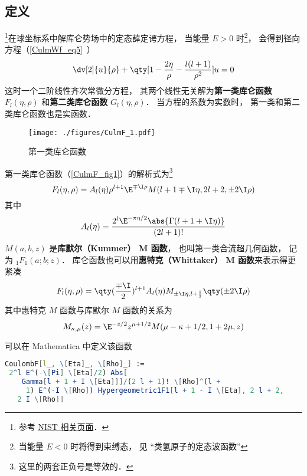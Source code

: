 

\subsection{定义}
\footnote{参考 \href{https://dlmf.nist.gov/33.2}{NIST 相关页面}．}在球坐标系中解库仑势场中的定态薛定谔方程， 当能量 $E > 0$ 时\footnote{当能量 $E < 0$ 时将得到束缚态， 见 “类氢原子的定态波函数”}， 会得到径向方程（\autoref{CulmWf_eq5}~）
\begin{equation}
\dv[2]{u}{\rho} + \qty[1 - \frac{2\eta}{\rho} - \frac{l(l+1)}{\rho^2}]u = 0
\end{equation}
这时一个二阶线性齐次常微分方程， 其两个线性无关解为\textbf{第一类库仑函数} $F_l(\eta, \rho)$ 和\textbf{第二类库仑函数} $G_l(\eta, \rho)$． 当方程的系数为实数时， 第一类和第二类库仑函数也是实函数．

\begin{figure}[ht]
\centering
\texttt{[image: ./figures/CulmF\_1.pdf]}
\caption{第一类库仑函数} \label{CulmF_fig1}
\end{figure}

第一类库仑函数（\autoref{CulmF_fig1}）的解析式为\footnote{这里的两套正负号是等效的．}
\begin{equation}
F_l(\eta, \rho) = A_l(\eta) \rho^{l+1} \E^{\mp\I\rho} M(l+1\mp\I\eta, 2l+2, \pm 2\I\rho)
\end{equation}
其中
\begin{equation}
A_l(\eta) = \frac{2^l \E^{-\pi\eta/2} \abs{\Gamma(l+1+\I\eta)}}{(2l+1)!}
\end{equation}
$M(a, b, z)$ 是\textbf{库默尔（Kummer） M 函数}， 也叫第一类合流超几何函数， 记为 $_1 F_1(a;b;z)$． 库仑函数也可以用\textbf{惠特克（Whittaker） M 函数}来表示得更紧凑
\begin{equation}
F_l(\eta, \rho) = \qty(\frac{\mp\I}{2})^{l+1} A_l(\eta) M_{\pm\I\eta, l+\frac12}\qty(\pm 2\I\rho)
\end{equation}
其中惠特克 $M$ 函数与库默尔 $M$ 函数的关系为
\begin{equation}
M_{\kappa, \mu}(z) = \E^{-z/2} z^{\mu + 1/2} M(\mu - \kappa + 1/2, 1 + 2\mu, z)
\end{equation}

可以在 Mathematica 中定义该函数
\begin{lstlisting}[language=Mathematica]
CoulombF[l_, \[Eta]_, \[Rho]_] := 
 2^l E^(-\[Pi] \[Eta]/2) Abs[
    Gamma[l + 1 + I \[Eta]]]/(2 l + 1)! \[Rho]^(l + 
     1) E^(-I \[Rho]) Hypergeometric1F1[l + 1 - I \[Eta], 2 l + 2, 
   2 I \[Rho]]
\end{lstlisting}

